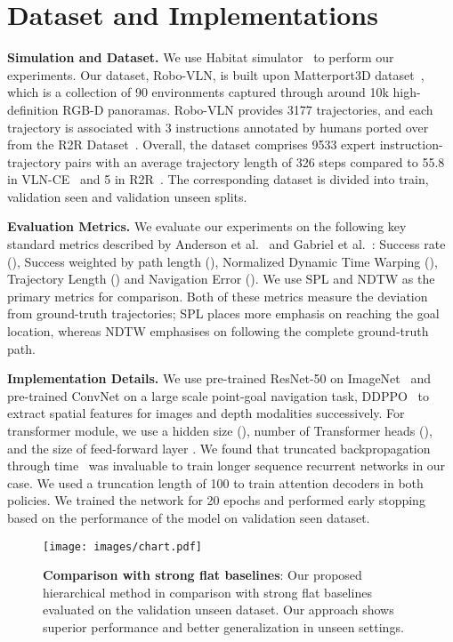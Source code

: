\documentclass[letter, 10pt, conference]{ieeeconf}
\begin{document}
\section{Dataset and Implementations}
\textbf{Simulation and Dataset.}
We use Habitat simulator~\cite{habitat19iccv} to perform our experiments. Our dataset, Robo-VLN, is built upon Matterport3D dataset~\cite{Matterport3D}, which is a collection of 90 environments captured through around 10k high-definition RGB-D panoramas.
Robo-VLN provides 3177 trajectories, and each trajectory is associated with 3 instructions annotated by humans ported over from the R2R Dataset~\cite{mattersim}. Overall, the dataset comprises 9533 expert instruction-trajectory pairs with an average trajectory length of 326 steps compared to 55.8 in VLN-CE~\cite{krantz2020navgraph} and 5 in R2R~\cite{mattersim}. The corresponding dataset is divided into train, validation seen and validation unseen splits.

\textbf{Evaluation Metrics.} We evaluate our experiments on the following key standard metrics described by Anderson et al.~\cite{DBLP:journals/corr/abs-1807-06757} and Gabriel et al.~\cite{49206}: Success rate (), Success weighted by path length (), Normalized Dynamic Time Warping (), Trajectory Length () and Navigation Error (). We use SPL and NDTW as the primary metrics for comparison. Both of these metrics measure the deviation from ground-truth trajectories; SPL places more emphasis on reaching the goal location, whereas NDTW emphasises on following the complete ground-truth path. 

\textbf{Implementation Details.}
We use pre-trained ResNet-50 on ImageNet~\cite{7780459} and pre-trained ConvNet on a large scale point-goal navigation task, DDPPO~\cite{wijmans2020ddppo} to extract spatial features for images and depth modalities successively.
For transformer module, we use a hidden size (), number of Transformer heads (), and the size of feed-forward layer . We found that truncated backpropagation through time~\cite{sutskever2013training} was invaluable to train longer sequence recurrent networks in our case. We used a truncation length of 100 to train attention decoders in both policies. We trained the network for 20 epochs and performed early stopping based on the performance of the model on validation seen dataset.

\begin{figure}[!b]
\centering
\texttt{[image: images/chart.pdf]}
\centering
  \caption{\textbf{Comparison with strong flat baselines}: Our proposed hierarchical method in comparison with strong flat baselines evaluated on the validation unseen dataset. Our approach shows superior performance and better generalization in unseen settings.
  }
  \label{comparison}
\end{figure}
\end{document}
